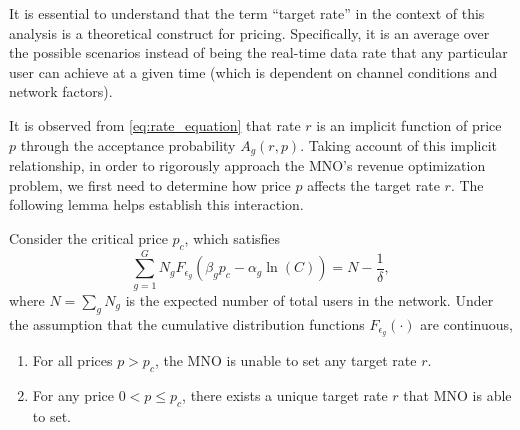 \documentclass[12pt, draftclsnofoot, onecolumn]{IEEEtran}
\begin{document}
	\begin{remark}
		It is essential to understand that the term “target rate” in the context of this analysis is a theoretical construct for pricing. Specifically, it is an average over the possible scenarios instead of being the real-time data rate that any particular user can achieve at a given time (which is dependent on channel conditions and network factors).
	\end{remark}
	It is observed from \eqref{eq:rate_equation}  that rate \( r \) is an implicit function of price \( p \) through the acceptance probability \( A_{g}(r,p) \).  Taking account of this implicit relationship, in order to rigorously approach the MNO's revenue optimization problem, we first need to determine how price $p$ affects the target rate $r$. The following lemma helps establish this interaction.
	\begin{lemma}\label{Lemma1}
		Consider the critical price $p_c$, which satisfies 
		\begin{equation}
			\sum_{g=1}^{G}N_g F_{\epsilon_g}\left(\beta_g p_c-\alpha_g \ln(C)\right)= N-\frac{1}{\delta},
		\end{equation}
		where $N=\sum_{g}N_g$ is the expected number of total users in the network. Under the assumption that the cumulative distribution functions \( F_{\epsilon_g}(\cdot) \) are continuous, 
		\begin{enumerate}\label{lemma1}
			\item For all prices $p>p_c$, the MNO is unable to set any target rate $r$.
			\item For any price $0<p\leq p_c$, there exists a unique target rate $r$ that MNO is able to set.
		\end{enumerate}
	\end{lemma}
\end{document}
